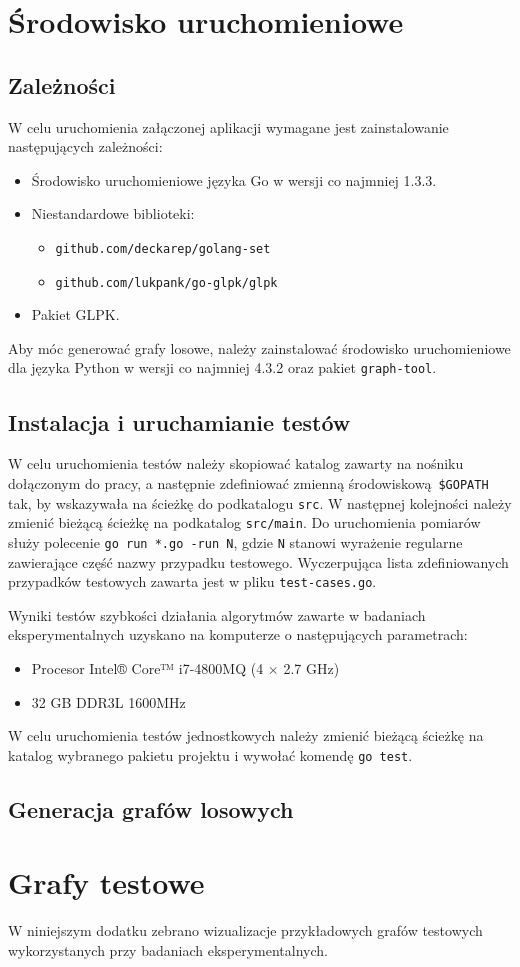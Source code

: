 \chapter{Środowisko uruchomieniowe}
\section{Zależności}
\par{
  W celu uruchomienia załączonej aplikacji wymagane jest zainstalowanie następujących zależności:
  \begin{itemize}
    \item Środowisko uruchomieniowe języka Go w wersji co najmniej 1.3.3.
    \item Niestandardowe biblioteki:
    \begin{itemize}
      \item \texttt{github.com/deckarep/golang-set}
      \item \texttt{github.com/lukpank/go-glpk/glpk}
    \end{itemize}
    \item Pakiet GLPK.
  \end{itemize} 
  Aby móc generować grafy losowe, należy zainstalować środowisko uruchomieniowe dla języka Python w wersji co najmniej 4.3.2 oraz pakiet \texttt{graph-tool}.
}
\section{Instalacja i uruchamianie testów}
\par{
  W celu uruchomienia testów należy skopiować katalog zawarty na nośniku dołączonym do pracy, a następnie zdefiniować zmienną środowiskową \texttt{\$GOPATH} tak, by wskazywała na ścieżkę do podkatalogu \texttt{src}.
  W następnej kolejności należy zmienić bieżącą ścieżkę na podkatalog \texttt{src/main}.
  Do uruchomienia pomiarów służy polecenie \texttt{go run *.go -run N}, gdzie \texttt{N} stanowi wyrażenie regularne zawierające część nazwy przypadku testowego.
  Wyczerpująca lista zdefiniowanych przypadków testowych zawarta jest w pliku \texttt{test-cases.go}.

  Wyniki testów szybkości działania algorytmów zawarte w badaniach eksperymentalnych uzyskano na komputerze o następujących parametrach:
  \begin{itemize}
    \item Procesor Intel® Core™ i7-4800MQ (4 $\times$ 2.7 GHz)
    \item 32 GB DDR3L 1600MHz
  \end{itemize}

  W celu uruchomienia testów jednostkowych należy zmienić bieżącą ścieżkę na katalog wybranego pakietu projektu i wywołać komendę \texttt{go test}.
}
\section{Generacja grafów losowych}

\chapter{Grafy testowe}
\par{
  W niniejszym dodatku zebrano wizualizacje przykładowych grafów testowych wykorzystanych przy badaniach eksperymentalnych. 
}